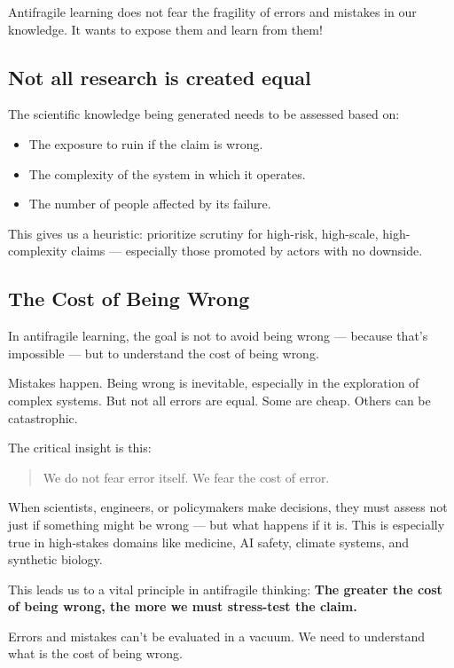 \documentclass{article}
\begin{document}
Antifragile learning does not fear the fragility of errors and mistakes in our knowledge. It wants to expose them and learn from them!

\subsection{Not all research is created equal}

The scientific knowledge being generated needs to be assessed based on:
\begin{itemize}
	\item The exposure to ruin if the claim is wrong.
	\item The complexity of the system in which it operates.
	\item The number of people affected by its failure.
\end{itemize}

This gives us a heuristic: prioritize scrutiny for high-risk, high-scale, high-complexity claims — especially those promoted by actors with no downside.

\subsection{The Cost of Being Wrong}

In antifragile learning, the goal is not to avoid being wrong — because that’s impossible — but to understand the cost of being wrong.

Mistakes happen. Being wrong is inevitable, especially in the exploration of complex systems. But not all errors are equal. Some are cheap. Others can be catastrophic. 

The critical insight is this:
\begin{quote}
	We do not fear error itself. We fear the cost of error.
\end{quote}

When scientists, engineers, or policymakers make decisions, they must assess not just if something might be wrong — but what happens if it is. This is especially true in high-stakes domains like medicine, AI safety, climate systems, and synthetic biology.

This leads us to a vital principle in antifragile thinking: \textbf{The greater the cost of being wrong, the more we must stress-test the claim.}

Errors and mistakes can't be evaluated in a vacuum. We need to understand what is the cost of being wrong. 
\end{document}
